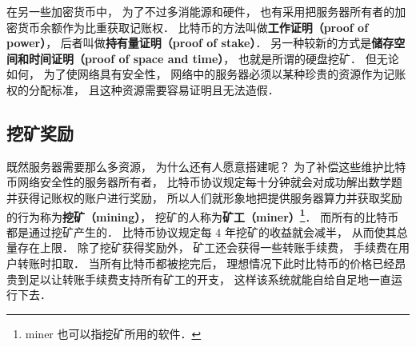 在另一些加密货币中， 为了不过多消能源和硬件， 也有采用把服务器所有者的加密货币余额作为比重获取记账权． 比特币的方法叫做\textbf{工作证明（proof of power）}， 后者叫做\textbf{持有量证明（proof of stake）}． 另一种较新的方式是\textbf{储存空间和时间证明（proof of space and time）}， 也就是所谓的硬盘挖矿． 但无论如何， 为了使网络具有安全性， 网络中的服务器必须以某种珍贵的资源作为记账权的分配标准， 且这种资源需要容易证明且无法造假．

\subsection{挖矿奖励}
既然服务器需要那么多资源， 为什么还有人愿意搭建呢？ 为了补偿这些维护比特币网络安全性的服务器所有者， 比特币协议规定每十分钟就会对成功解出数学题并获得记账权的账户进行奖励， 所以人们就形象地把提供服务器算力并获取奖励的行为称为\textbf{挖矿（mining）}， 挖矿的人称为\textbf{矿工（miner）\footnote{miner 也可以指挖矿所用的软件．}}． 而所有的比特币都是通过挖矿产生的． 比特币协议规定每 4 年挖矿的收益就会减半， 从而使其总量存在上限． 除了挖矿获得奖励外， 矿工还会获得一些转账手续费， 手续费在用户转账时扣取． 当所有比特币都被挖完后， 理想情况下此时比特币的价格已经昂贵到足以让转账手续费支持所有矿工的开支， 这样该系统就能自给自足地一直运行下去．
